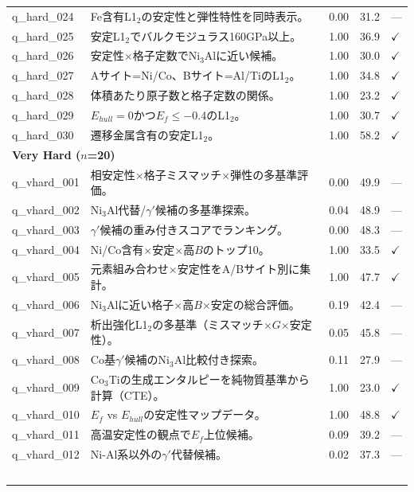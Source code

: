\documentclass{npj-compt.mater}
\begin{document}
\begin{longtable}{lp{8.5cm}ccl}
    q\_hard\_024 & Fe含有L1$_2$の安定性と弾性特性を同時表示。 & 0.00 & 31.2 & --- \\
    q\_hard\_025 & 安定L1$_2$でバルクモジュラス160GPa以上。 & 1.00 & 36.9 & $\checkmark$ \\
    q\_hard\_026 & 安定性$\times$格子定数でNi$_3$Alに近い候補。 & 1.00 & 30.0 & $\checkmark$ \\
    q\_hard\_027 & Aサイト=Ni/Co、Bサイト=Al/TiのL1$_2$。 & 1.00 & 34.8 & $\checkmark$ \\
    q\_hard\_028 & 体積あたり原子数と格子定数の関係。 & 1.00 & 23.2 & $\checkmark$ \\
    q\_hard\_029 & $E_{hull} = 0$かつ$E_f \leq -0.4$のL1$_2$。 & 1.00 & 30.7 & $\checkmark$ \\
    q\_hard\_030 & 遷移金属含有の安定L1$_2$。 & 1.00 & 58.2 & $\checkmark$ \\
    \midrule
    \multicolumn{5}{l}{\textbf{Very Hard ($n$=20)}} \\
    \midrule
    q\_vhard\_001 & 相安定性$\times$格子ミスマッチ$\times$弾性の多基準評価。 & 0.00 & 49.9 & --- \\
    q\_vhard\_002 & Ni$_3$Al代替/$\gamma'$候補の多基準探索。 & 0.04 & 48.9 & --- \\
    q\_vhard\_003 & $\gamma'$候補の重み付きスコアでランキング。 & 0.00 & 48.3 & --- \\
    q\_vhard\_004 & Ni/Co含有$\times$安定$\times$高$B$のトップ10。 & 1.00 & 33.5 & $\checkmark$ \\
    q\_vhard\_005 & 元素組み合わせ$\times$安定性をA/Bサイト別に集計。 & 1.00 & 47.7 & $\checkmark$ \\
    q\_vhard\_006 & Ni$_3$Alに近い格子$\times$高$B$$\times$安定の総合評価。 & 0.19 & 42.4 & --- \\
    q\_vhard\_007 & 析出強化L1$_2$の多基準（ミスマッチ$\times$$G$$\times$安定性）。 & 0.05 & 45.8 & --- \\
    q\_vhard\_008 & Co基$\gamma'$候補のNi$_3$Al比較付き探索。 & 0.11 & 27.9 & --- \\
    q\_vhard\_009 & Co$_3$Tiの生成エンタルピーを純物質基準から計算（CTE）。 & 1.00 & 23.0 & $\checkmark$ \\
    q\_vhard\_010 & $E_f$ vs $E_{hull}$の安定性マップデータ。 & 1.00 & 48.8 & $\checkmark$ \\
    q\_vhard\_011 & 高温安定性の観点で$E_f$上位候補。 & 0.09 & 39.2 & --- \\
    q\_vhard\_012 & Ni-Al系以外の$\gamma'$代替候補。 & 0.02 & 37.3 & --- \\
$$
\end{longtable}
\end{document}
